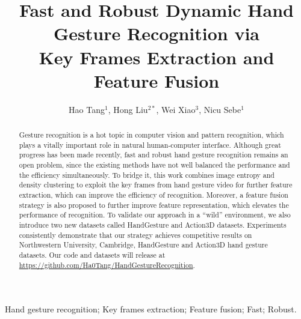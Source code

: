 \documentclass[5p]{elsarticle}
\begin{document}
\begin{frontmatter}

\title{Fast and Robust Dynamic Hand Gesture Recognition via \\ Key Frames Extraction and Feature Fusion}

\author{Hao Tang$^{1}$, Hong Liu$^{2*}$, Wei Xiao$^3$, Nicu Sebe$^1$}

\address{
$^1$Department of Information Engineering and Computer Science, University of Trento, Trento, Italy \\
$^2$Key Laboratory of Machine Perception, Shenzhen Graduate School, Peking University, Beijing, China \\
$^3$Lingxi Artificial Intelligence Co., Ltd, Shen Zhen, China\\  
}



\begin{abstract}
	Gesture recognition is a hot topic in computer vision and pattern recognition, which plays a vitally important role in natural human-computer interface.
	Although great progress has been made recently, fast and robust hand gesture recognition remains an open problem,
	since the existing methods have not well balanced the performance and the efficiency simultaneously.
	To bridge it, this work combines image entropy and density clustering to exploit the key frames from hand gesture video for further feature extraction, which can improve the efficiency of recognition.
	Moreover, a feature fusion strategy is also proposed to further improve feature representation, which elevates the performance of recognition.
	To validate our approach in a ``wild'' environment, we also introduce two new datasets called HandGesture and Action3D datasets.
	Experiments consistently demonstrate that our strategy achieves competitive results on Northwestern University, Cambridge, HandGesture and Action3D hand gesture datasets.
	Our code and datasets will release at \url{https://github.com/Ha0Tang/HandGestureRecognition}.
\end{abstract}

\begin{keyword}
Hand gesture recognition; Key frames extraction; Feature fusion; Fast; Robust.
\end{keyword}

\end{frontmatter}
\end{document}
